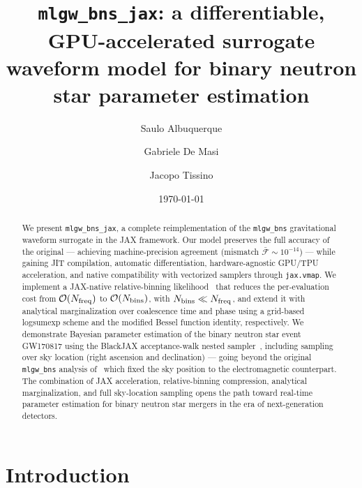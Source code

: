 \documentclass[twocolumn,superscriptaddress,nofootinbib,aps,prd]{revtex4-2}
\newcommand{\tbd}[1]{{\color{red}\textbf{[#1]}}}
\begin{document}
\title{%
\texttt{mlgw\_bns\_jax}: a differentiable, GPU-accelerated surrogate waveform model
for binary neutron star parameter estimation%
}

\author{Saulo Albuquerque}
\affiliation{\tbd{Affiliation}}

\author{Gabriele De Masi}
\affiliation{\tbd{Affiliation}}

\author{Jacopo Tissino}

\date{\today}

\begin{abstract}
We present \texttt{mlgw\_bns\_jax}, a complete reimplementation of the
\texttt{mlgw\_bns} gravitational waveform surrogate in the JAX framework.
Our model preserves the full accuracy of the original --- achieving
machine-precision agreement (mismatch $\bar{\mathcal{F}} \sim 10^{-14}$)
--- while gaining JIT compilation, automatic differentiation, hardware-agnostic
GPU/TPU acceleration, and native compatibility with vectorized samplers
through \texttt{jax.vmap}.  We implement a JAX-native relative-binning
likelihood~\cite{Zackay:2018} that reduces the per-evaluation cost from
$\mathcal{O}(N_{\rm freq})$ to $\mathcal{O}(N_{\rm bins})$, with
$N_{\rm bins} \ll N_{\rm freq}$, and extend it with analytical
marginalization over coalescence time and phase using a grid-based
logsumexp scheme and the modified Bessel function identity,
respectively.  We demonstrate Bayesian parameter estimation of the
binary neutron star event GW170817 using the BlackJAX acceptance-walk
nested sampler~\cite{BlackJAX,Handley:2015fda}, including sampling over
sky location (right ascension and declination) --- going beyond the
original \texttt{mlgw\_bns} analysis of~\cite{Tissino:2022} which fixed
the sky position to the electromagnetic counterpart.  The combination of
JAX acceleration, relative-binning compression, analytical
marginalization, and full sky-location sampling opens the path toward
real-time parameter estimation for binary neutron star mergers in the
era of next-generation detectors.
\end{abstract}

\maketitle

\section{Introduction}
\label{sec:intro}
\end{document}
